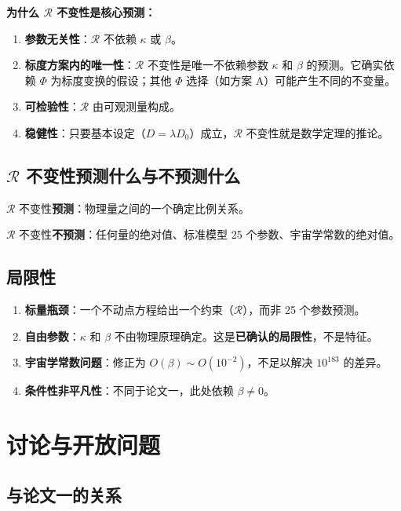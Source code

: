 \documentclass[11pt,a4paper]{ctexart}
\theoremstyle{remark}
\newcommand{\R}{\mathcal{R}}
\begin{document}
\textbf{为什么 $\R$ 不变性是核心预测：}
\begin{enumerate}
  \item \textbf{参数无关性}：$\R$ 不依赖 $\kappa$ 或 $\beta$。
  \item \textbf{标度方案内的唯一性}：$\R$ 不变性是唯一不依赖参数 $\kappa$ 和 $\beta$ 的预测。它确实依赖 $\Phi$ 为标度变换的假设；其他 $\Phi$ 选择（如方案 A）可能产生不同的不变量。
  \item \textbf{可检验性}：$\R$ 由可观测量构成。
  \item \textbf{稳健性}：只要基本设定（$D = \lambda D_0$）成立，$\R$ 不变性就是数学定理的推论。
\end{enumerate}

\subsection{$\R$ 不变性预测什么与不预测什么}

$\R$ 不变性\textbf{预测}：物理量之间的一个确定比例关系。

$\R$ 不变性\textbf{不预测}：任何量的绝对值、标准模型 25 个参数、宇宙学常数的绝对值。

\subsection{局限性}

\begin{enumerate}
  \item \textbf{标量瓶颈}：一个不动点方程给出一个约束（$\R$），而非 25 个参数预测。
  \item \textbf{自由参数}：$\kappa$ 和 $\beta$ 不由物理原理确定。这是\textbf{已确认的局限性}，不是特征。
  \item \textbf{宇宙学常数问题}：修正为 $O(\beta) \sim O(10^{-2})$，不足以解决 $10^{183}$ 的差异。
  \item \textbf{条件性非平凡性}：不同于论文一，此处依赖 $\beta \neq 0$。
\end{enumerate}

\section{讨论与开放问题}

\subsection{与论文一的关系}
\end{document}

